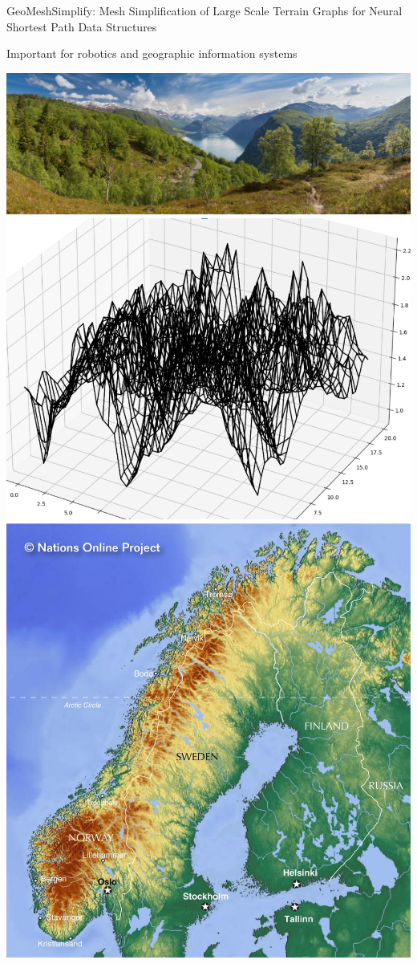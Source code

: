 \begin{frame}{GeoMeshSimplify: Mesh Simplification of Large Scale Terrain Graphs for Neural Shortest Path Data Structures}
    \begin{center}
        Important for robotics and geographic information systems
         
    \end{center}
    \includegraphics[scale=.07]{images/norway_fjord.jpg}
    \includegraphics[scale=0.3]{images/norway.png}
    \includegraphics[scale=0.1]{images/topo-map.jpg}

\end{frame}
